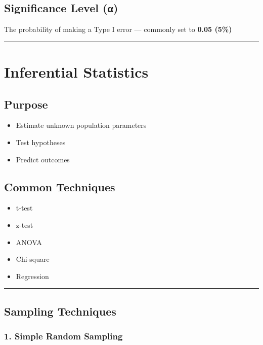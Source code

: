 \documentclass[
  letterpaper,
  DIV=11,
  numbers=noendperiod]{scrreprt}
\providecommand{\tightlist}{%
  \setlength{\itemsep}{0pt}\setlength{\parskip}{0pt}}
\begin{document}
\subsection{Significance Level (α)}\label{significance-level-ux3b1}

The probability of making a Type I error --- commonly set to
\textbf{0.05 (5\%)}

\begin{center}\rule{0.5\linewidth}{0.5pt}\end{center}

\section{Inferential Statistics}\label{inferential-statistics}

\subsection{Purpose}\label{purpose}

\begin{itemize}
\tightlist
\item
  Estimate unknown population parameters
\item
  Test hypotheses
\item
  Predict outcomes
\end{itemize}

\subsection{Common Techniques}\label{common-techniques}

\begin{itemize}
\tightlist
\item
  t-test
\item
  z-test
\item
  ANOVA
\item
  Chi-square
\item
  Regression
\end{itemize}

\begin{center}\rule{0.5\linewidth}{0.5pt}\end{center}

\subsection{Sampling Techniques}\label{sampling-techniques}

\subsubsection{1. Simple Random Sampling}\label{simple-random-sampling}
\end{document}
